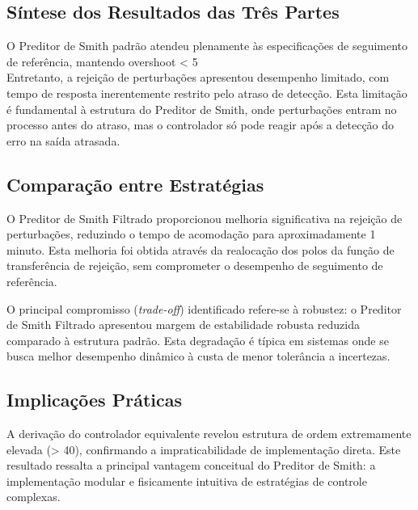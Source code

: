 \documentclass[a4paper,12pt]{article}
\begin{document}
\subsection{Síntese dos Resultados das Três Partes}

O Preditor de Smith padrão atendeu plenamente às especificações de seguimento de referência, mantendo overshoot < 5\\%

Entretanto, a rejeição de perturbações apresentou desempenho limitado, com tempo de resposta inerentemente restrito pelo atraso de detecção. Esta limitação é fundamental à estrutura do Preditor de Smith, onde perturbações entram no processo antes do atraso, mas o controlador só pode reagir após a detecção do erro na saída atrasada.

\subsection{Comparação entre Estratégias}

O Preditor de Smith Filtrado proporcionou melhoria significativa na rejeição de perturbações, reduzindo o tempo de acomodação para aproximadamente 1 minuto. Esta melhoria foi obtida através da realocação dos polos da função de transferência de rejeição, sem comprometer o desempenho de seguimento de referência.

O principal compromisso (\textit{trade-off}) identificado refere-se à robustez: o Preditor de Smith Filtrado apresentou margem de estabilidade robusta reduzida comparado à estrutura padrão. Esta degradação é típica em sistemas onde se busca melhor desempenho dinâmico à custa de menor tolerância a incertezas.

\subsection{Implicações Práticas}

A derivação do controlador equivalente revelou estrutura de ordem extremamente elevada (> 40), confirmando a impraticabilidade de implementação direta. Este resultado ressalta a principal vantagem conceitual do Preditor de Smith: a implementação modular e fisicamente intuitiva de estratégias de controle complexas.
\end{document}
